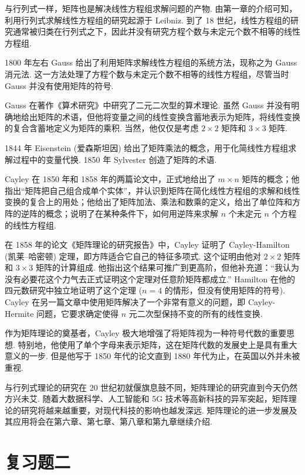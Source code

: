 \documentclass[UTF8, 12pt, fontset=fandol, oneside]{ctexart}
\begin{document}
与行列式一样，矩阵也是解决线性方程组求解问题的产物. 由第一章的介绍可知，利用行列式求解线性方程组的研究起源于 Leibniz. 到了 18 世纪，线性方程组的研究通常被归类在行列式之下，因此并没有研究方程个数与未定元个数不相等的线性方程组.

1800 年左右 Gauss 给出了利用矩阵求解线性方程组的系统方法，现称之为 Gauss 消元法. 这一方法处理了方程个数与未定元个数不相等的线性方程组，尽管当时 Gauss 并没有使用矩阵的符号.

Gauss 在著作《算术研究》中研究了二元二次型的算术理论. 虽然 Gauss 并没有明确地给出矩阵的术语，但他将变量之间的线性变换含蓄地表示为矩阵，将线性变换的复合含蓄地定义为矩阵的乘积. 当然，他仅仅是考虑 $2\times 2$ 矩阵和 $3\times 3$ 矩阵.

1844 年 Eisenstein (爱森斯坦因) 给出了矩阵乘法的概念，用于化简线性方程组求解过程中的变量代换. 1850 年 Sylvester 创造了矩阵的术语.

Cayley 在 1850 年和 1858 年的两篇论文中，正式地给出了 $m\times n$ 矩阵的概念；他指出“矩阵把自己组合成单个实体”，并认识到矩阵在简化线性方程组的求解和线性变换的复合上的用处；他给出了矩阵加法、乘法和数乘的定义，给出了单位阵和方阵的逆阵的概念；说明了在某种条件下，如何用逆阵来求解 $n$ 个未定元 $n$ 个方程的线性方程组.

在 1858 年的论文《矩阵理论的研究报告》中，Cayley 证明了 Cayley-Hamilton (凯莱--哈密顿) 定理，即方阵适合它自己的特征多项式. 这个证明由他对 $2\times 2$ 矩阵和 $3\times 3$ 矩阵的计算组成. 他指出这个结果可推广到更高阶，但他补充道：“我认为没有必要花这个力气去正式证明这个定理对任意阶矩阵都成立.” Hamilton 在他的四元数研究中独立地证明了这个定理 ($n=4$ 的情形，但没有使用矩阵的符号). Cayley 在另一篇文章中使用矩阵解决了一个非常有意义的问题，即 Cayley-Hermite 问题，它要求确定使得 $n$ 元二次型保持不变的所有的线性变换.

作为矩阵理论的奠基者，Cayley 极大地增强了将矩阵视为一种符号代数的重要思想. 特别地，他使用了单个字母来表示矩阵，这在矩阵代数的发展史上是具有重大意义的一步. 但是他写于 1850 年代的论文直到 1880 年代为止，在英国以外并未被重视.

与行列式理论的研究在 20 世纪初就偃旗息鼓不同，矩阵理论的研究直到今天仍然方兴未艾. 随着大数据科学、人工智能和 5G 技术等高新科技的异军突起，矩阵理论的研究将越来越重要，对现代科技的影响也越发深远. 矩阵理论的进一步发展及其应用将会在第六章、第七章、第八章和第九章继续介绍.

\section*{复习题二}
\end{document}
